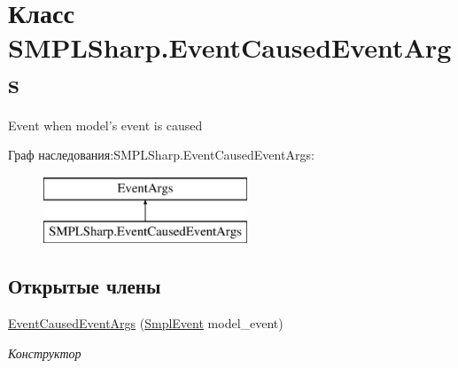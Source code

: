 \hypertarget{class_s_m_p_l_sharp_1_1_event_caused_event_args}{\section{Класс S\-M\-P\-L\-Sharp.\-Event\-Caused\-Event\-Args}
\label{d0/dff/class_s_m_p_l_sharp_1_1_event_caused_event_args}
}


Event when model's event is caused  


Граф наследования\-:S\-M\-P\-L\-Sharp.\-Event\-Caused\-Event\-Args\-:\begin{figure}[H]
\begin{center}
\leavevmode
\includegraphics[height=2.000000cm]{d0/dff/class_s_m_p_l_sharp_1_1_event_caused_event_args}
\end{center}
\end{figure}
\subsection*{Открытые члены}
\begin{DoxyCompactItemize}
\item 
\hyperlink{class_s_m_p_l_sharp_1_1_event_caused_event_args_ad51196e10ac6101a36dda35b283b182e}{Event\-Caused\-Event\-Args} (\hyperlink{class_s_m_p_l_sharp_1_1_objects_1_1_smpl_event}{Smpl\-Event} model\-\_\-event)
\begin{DoxyCompactList}\small\item\em Конструктор \end{DoxyCompactList}\end{DoxyCompactItemize}

